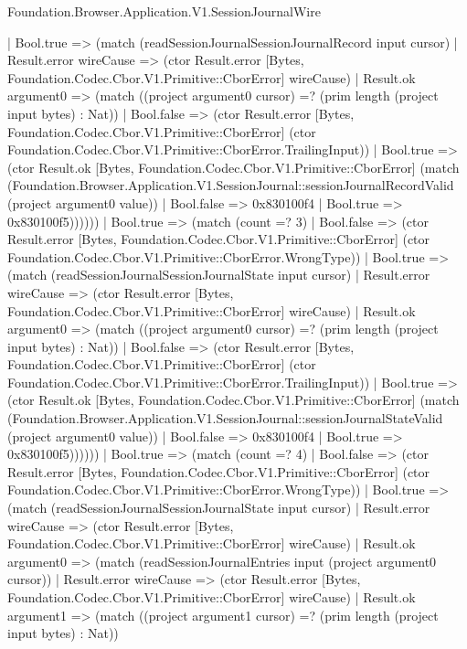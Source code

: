 \begin{lexlean}{Foundation.Browser.Application.V1.SessionJournalWire}
\begin{semanticmodule}
{              | Bool.true => (match (readSessionJournalSessionJournalRecord input cursor)
                | Result.error wireCause => (ctor Result.error [Bytes, Foundation.Codec.Cbor.V1.Primitive::CborError] wireCause)
                | Result.ok argument0 => (match ((project argument0 cursor) =? (prim length (project input bytes) : Nat))
                  | Bool.false => (ctor Result.error [Bytes, Foundation.Codec.Cbor.V1.Primitive::CborError] (ctor Foundation.Codec.Cbor.V1.Primitive::CborError.TrailingInput))
                  | Bool.true => (ctor Result.ok [Bytes, Foundation.Codec.Cbor.V1.Primitive::CborError] (match (Foundation.Browser.Application.V1.SessionJournal::sessionJournalRecordValid (project argument0 value))
                    | Bool.false => 0x830100f4
                    | Bool.true => 0x830100f5))))))
          | Bool.true => (match (count =? 3)
            | Bool.false => (ctor Result.error [Bytes, Foundation.Codec.Cbor.V1.Primitive::CborError] (ctor Foundation.Codec.Cbor.V1.Primitive::CborError.WrongType))
            | Bool.true => (match (readSessionJournalSessionJournalState input cursor)
              | Result.error wireCause => (ctor Result.error [Bytes, Foundation.Codec.Cbor.V1.Primitive::CborError] wireCause)
              | Result.ok argument0 => (match ((project argument0 cursor) =? (prim length (project input bytes) : Nat))
                | Bool.false => (ctor Result.error [Bytes, Foundation.Codec.Cbor.V1.Primitive::CborError] (ctor Foundation.Codec.Cbor.V1.Primitive::CborError.TrailingInput))
                | Bool.true => (ctor Result.ok [Bytes, Foundation.Codec.Cbor.V1.Primitive::CborError] (match (Foundation.Browser.Application.V1.SessionJournal::sessionJournalStateValid (project argument0 value))
                  | Bool.false => 0x830100f4
                  | Bool.true => 0x830100f5))))))
        | Bool.true => (match (count =? 4)
          | Bool.false => (ctor Result.error [Bytes, Foundation.Codec.Cbor.V1.Primitive::CborError] (ctor Foundation.Codec.Cbor.V1.Primitive::CborError.WrongType))
          | Bool.true => (match (readSessionJournalSessionJournalState input cursor)
            | Result.error wireCause => (ctor Result.error [Bytes, Foundation.Codec.Cbor.V1.Primitive::CborError] wireCause)
            | Result.ok argument0 => (match (readSessionJournalEntries input (project argument0 cursor))
              | Result.error wireCause => (ctor Result.error [Bytes, Foundation.Codec.Cbor.V1.Primitive::CborError] wireCause)
              | Result.ok argument1 => (match ((project argument1 cursor) =? (prim length (project input bytes) : Nat))
}
\end{semanticmodule}
\end{lexlean}
